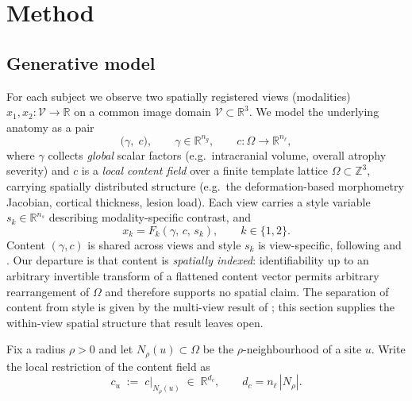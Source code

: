 
\section{Method}
\label{sec:method}

\subsection{Generative model}
\label{sec:gen}

For each subject we observe two spatially registered views (modalities)
$x_1, x_2 : \mathcal{V} \to \mathbb{R}$ on a common image domain
$\mathcal{V} \subset \mathbb{R}^3$. We model the underlying anatomy as a pair
\begin{equation}
  \big(\gamma,\; c\big), \qquad
  \gamma \in \mathbb{R}^{n_g}, \qquad
  c : \Omega \to \mathbb{R}^{n_\ell},
\end{equation}
where $\gamma$ collects \emph{global} scalar factors (e.g.\ intracranial volume, overall
atrophy severity) and $c$ is a \emph{local content field} over a finite template lattice
$\Omega \subset \mathbb{Z}^3$, carrying spatially distributed structure (e.g.\ the
deformation-based morphometry Jacobian, cortical thickness, lesion load). Each view carries a
style variable $s_k \in \mathbb{R}^{n_s}$ describing modality-specific contrast, and
\begin{equation}
  x_k = F_k(\gamma,\, c,\, s_k), \qquad k \in \{1,2\}.
\end{equation}
Content $(\gamma, c)$ is shared across views and style $s_k$ is view-specific, following
\citet{vonkugelgen2021} and \citet{yao2024}. Our departure is that content is
\emph{spatially indexed}: identifiability up to an arbitrary invertible transform of a
flattened content vector permits arbitrary rearrangement of $\Omega$ and therefore supports no
spatial claim. The separation of content from style is given by the multi-view result of
\citet{yao2024}; this section supplies the within-view spatial structure that result leaves
open.

Fix a radius $\rho > 0$ and let $N_\rho(u) \subset \Omega$ be the $\rho$-neighbourhood of a
site $u$. Write the local restriction of the content field as
\begin{equation}
  c_u \;:=\; c\big|_{N_\rho(u)} \;\in\; \mathbb{R}^{d_c},
  \qquad d_c = n_\ell \, |N_\rho| .
\end{equation}

